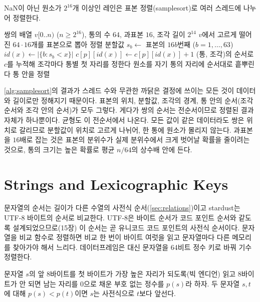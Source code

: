 NaN이 아닌 원소가 $2^{16}$개 이상인 레인은 표본 정렬(samplesort)로 여러 스레드에 나누어 정렬한다\cite{frazer1970samplesort}.

\begin{algorithm}[htbp]
\begin{algorithmic}[1]
\Require 쌍의 배열 $v[0..n)$ ($n\ge2^{16}$), 통의 수 $64$, 과표본 $16$, 조각 길이 $2^{14}$
\State $v$에서 고르게 떨어진 $64\cdot16$개를 표본으로 뽑아 정렬
\State 분할값 $s_b\gets$ 표본의 $16b$번째 ($b=1,\dots,63$)
    \State $\mathit{id}(x)\gets|\{b:s_b<x\}|$ 
    \State $c[p][\mathit{id}(x)]\gets c[p][\mathit{id}(x)]+1$
  \EndFor
\EndFor
\State (통, 조각)의 순서로 $c$를 누적해 조각마다 통별 첫 자리를 정한다
 원소를 자기 통의 자리에 순서대로 흩뿌린다 \EndFor
{} 통 안을 정렬 \EndFor
\end{algorithmic}
\caption{표본 정렬 (stardust , rankdata의 긴 레인)}
\label{alg:samplesort}
\end{algorithm}

\cref{alg:samplesort}의 결과가 스레드 수와 무관한 까닭은 결정에 쓰이는 모든 것이 데이터와 길이로만 정해지기 때문이다. 표본의 위치, 분할값, 조각의 경계, 통 안의 순서(조각 순서와 조각 안의 순서)가 모두 그렇다. 게다가 쌍의 순서는 전순서이므로 정렬된 결과 자체가 하나뿐이다. 균형도 이 전순서에서 나온다. 모든 값이 같은 데이터라도 쌍은 위치로 갈리므로 분할값이 위치로 고르게 나뉘어, 한 통에 원소가 몰리지 않는다. 과표본을 $16$배로 잡는 것은 표본의 분위수가 실제 분위수에서 크게 벗어날 확률을 줄이려는 것으로, 통의 크기는 높은 확률로 평균 $n/64$의 상수배 안에 든다.

\section{Strings and Lexicographic Keys}
\label{sec:string-keys}

문자열의 순서는 길이가 다른 수열의 사전식 순서(\cref{sec:relations})이고 stardust는 UTF-8 바이트의 순서로 비교한다. UTF-8은 바이트 순서가 코드 포인트 순서와 같도록 설계되었으므로(15장) 이 순서는 곧 유니코드 코드 포인트의 사전식 순서이다. 문자열을 비교 함수로 정렬하면 비교 한 번이 바이트 여럿을 읽고 문자열마다 다른 메모리를 찾아가야 해서 느리다. 데이터프레임은 대신 문자열을 64비트 정수 키로 바꿔 기수 정렬한다.

\begin{proposition}
\label{prop:string-prefix}
문자열 $s$의 앞 8바이트를 첫 바이트가 가장 높은 자리가 되도록(빅 엔디언) 읽고 8바이트가 안 되면 남는 자리를 $0$으로 채운 부호 없는 정수를 $p(s)$라 하자. 두 문자열 $s,t$에 대해 $p(s)<p(t)$이면 $s$는 사전식으로 $t$보다 앞선다.
\end{proposition}

